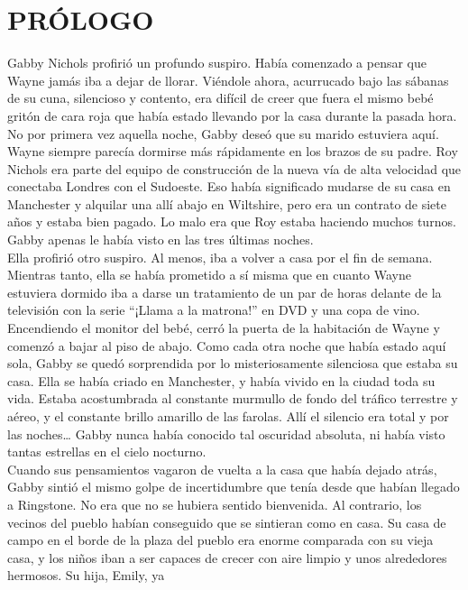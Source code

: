 \chapter*{PRÓLOGO}
Gabby Nichols profirió un profundo suspiro. Había comenzado a pensar que
Wayne jamás iba a dejar de llorar. Viéndole ahora, acurrucado bajo las
sábanas de su cuna, silencioso y contento, era difícil de creer que
fuera el mismo bebé gritón de cara roja que había estado llevando por la
casa durante la pasada hora.\\
No por primera vez aquella noche, Gabby deseó que su marido estuviera
aquí. Wayne siempre parecía dormirse más rápidamente en los brazos de su
padre. Roy Nichols era parte del equipo de construcción de la nueva vía
de alta velocidad que conectaba Londres con el Sudoeste. Eso había
significado mudarse de su casa en Manchester y alquilar una allí abajo
en Wiltshire, pero era un contrato de siete años y estaba bien pagado.
Lo malo era que Roy estaba haciendo muchos turnos. Gabby apenas le había
visto en las tres últimas noches.\\
Ella profirió otro suspiro. Al menos, iba a volver a casa por el fin de
semana. Mientras tanto, ella se había prometido a sí misma que en cuanto
Wayne estuviera dormido iba a darse un tratamiento de un par de horas
delante de la televisión con la serie ``¡Llama a la matrona!'' en DVD y
una copa de vino.\\
Encendiendo el monitor del bebé, cerró la puerta de la habitación de
Wayne y comenzó a bajar al piso de abajo. Como cada otra noche que había
estado aquí sola, Gabby se quedó sorprendida por lo misteriosamente
silenciosa que estaba su casa. Ella se había criado en Manchester, y
había vivido en la ciudad toda su vida. Estaba acostumbrada al constante
murmullo de fondo del tráfico terrestre y aéreo, y el constante brillo
amarillo de las farolas. Allí el silencio era total y por las
noches\ldots{} Gabby nunca había conocido tal oscuridad absoluta, ni
había visto tantas estrellas en el cielo nocturno.\\
Cuando sus pensamientos vagaron de vuelta a la casa que había dejado
atrás, Gabby sintió el mismo golpe de incertidumbre que tenía desde que
habían llegado a Ringstone. No era que no se hubiera sentido bienvenida.
Al contrario, los vecinos del pueblo habían conseguido que se sintieran
como en casa. Su casa de campo en el borde de la plaza del pueblo era
enorme comparada con su vieja casa, y los niños iban a ser capaces de
crecer con aire limpio y unos alrededores hermosos. Su hija, Emily, ya
